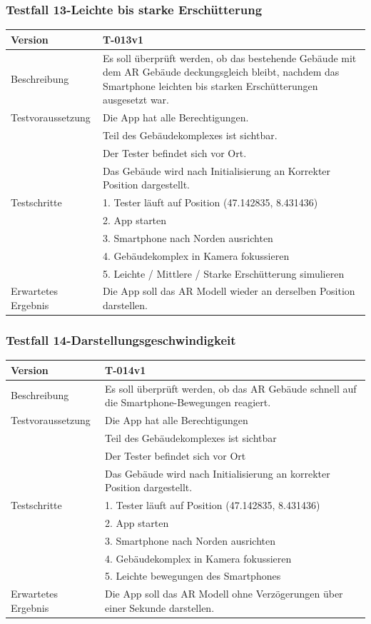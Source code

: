 \documentclass[a4paper]{scrreprt}
\begin{document}
\subsubsection{Testfall 13-Leichte bis starke Erschütterung}
\begin{tabularx}{\textwidth}{|l|X|}
\hline 
	Version &
	T-013v1 \\ 
\hline 
	Beschreibung & 
	Es soll überprüft werden, ob das bestehende Gebäude mit dem AR Gebäude deckungsgleich bleibt, nachdem das Smartphone leichten bis starken Erschütterungen ausgesetzt war. \\ 
\hline 
	Testvoraussetzung &
	Die App hat alle Berechtigungen. \\ &
	Teil des Gebäudekomplexes ist sichtbar. \\ &
	Der Tester befindet sich vor Ort. \\ &
	Das Gebäude wird nach Initialisierung an Korrekter Position dargestellt. \\
\hline 
	Testschritte & 
		1. Tester läuft auf Position (47.142835, 8.431436) \\ &
		2. App starten\\ &
		3. Smartphone nach Norden ausrichten\\ &
		4. Gebäudekomplex in Kamera fokussieren\\ &
		5. Leichte / Mittlere / Starke Erschütterung simulieren\\
\hline
	Erwartetes Ergebnis &
	Die App soll das AR Modell wieder an derselben Position darstellen.\\ 
\hline 
\end{tabularx}

\subsubsection{Testfall 14-Darstellungsgeschwindigkeit}
\begin{tabularx}{\textwidth}{|l|X|}
\hline 
	Version &
	T-014v1 \\ 
\hline 
	Beschreibung & 
	Es soll überprüft werden, ob das AR Gebäude schnell auf die Smartphone-Bewegungen reagiert. \\ 
\hline 
	Testvoraussetzung &
	Die App hat alle Berechtigungen \\ &
	Teil des Gebäudekomplexes ist sichtbar \\ &
	Der Tester befindet sich vor Ort \\ &
	Das Gebäude wird nach Initialisierung an korrekter Position dargestellt. \\
\hline 
	Testschritte & 
		1. Tester läuft auf Position (47.142835, 8.431436) \\ &
		2. App starten \\ &
		3. Smartphone nach Norden ausrichten\\ &
		4. Gebäudekomplex in Kamera fokussieren\\ &
		5. Leichte bewegungen des Smartphones\\
\hline
	Erwartetes Ergebnis &
	Die App soll das AR Modell ohne Verzögerungen über einer Sekunde darstellen. \\ 
\hline 
\end{tabularx}
\end{document}
